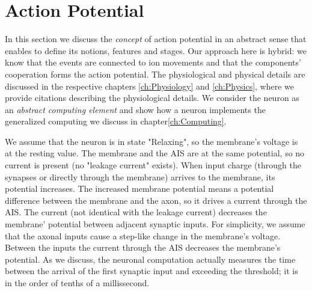 
\section{Action Potential\label{sec:Computing-ActionPotential}}

In this section we discuss the  \textit{concept} of
{action potential}
in an abstract sense that enables to define its notions, features and stages.
Our approach here is hybrid: we know that the events are connected 
to ion movements and that the components' cooperation forms the action potential.
The %
{physiological}
and 
{physical} details
are discussed in the respective chapters \ref{ch:Physiology} and \ref{ch:Physics}, where we provide citations describing the physiological details.
We consider the neuron as an \textit{abstract computing element}
and show how a neuron implements the generalized computing we discuss in chapter\ref{ch:Computing}.

We assume that the neuron is in state "Relaxing", so the membrane's voltage is at the resting value. The membrane and the 
\gls{AIS}
are at the same potential, so no current is present (no "leakage current" exists).
When input charge (through the synapses or directly through the membrane)
 arrives to the membrane, its potential increases. The increased membrane potential means a potential difference between the membrane and the axon, so it drives a current through the AIS.
The current
 (not identical with the leakage current)
 decreases the membrane' potential between adjacent synaptic inputs.
   For simplicity, we assume that the axonal inputs cause a step-like change in the membrane's voltage. Between the inputs the current through the
   \gls{AIS}
decreases the membrane's potential. As we discuss, the neuronal computation actually measures the time between the arrival of the first synaptic input and exceeding the threshold; it is in the order of tenths of a millissecond.

